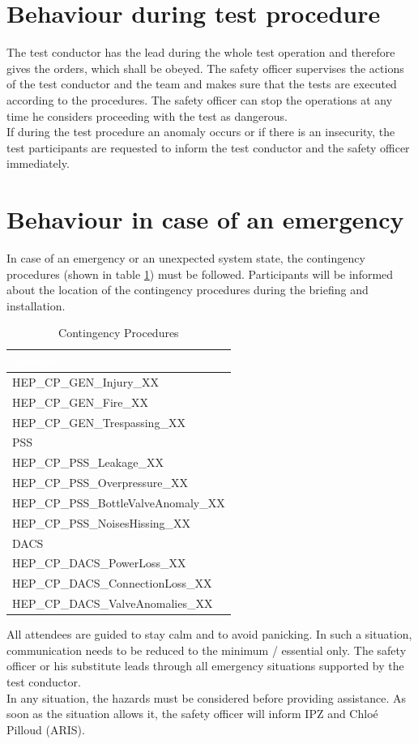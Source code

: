 \documentclass{article}
\begin{document}
\section{Behaviour during test procedure}
The test conductor has the lead during the whole test operation and therefore gives the orders, which shall be obeyed. The safety officer supervises the actions of the test conductor and the team and makes sure that the tests are executed according to the procedures. The safety officer can stop the operations at any time he considers proceeding with the test as dangerous. \\
\noindent
If during the test procedure an anomaly occurs or if there is an insecurity, the test participants are requested to inform the test conductor and the safety officer immediately.

\newpage
\section{Behaviour in case of an emergency} \label{emergency-behaviour}
In case of an emergency or an unexpected system state, the contingency procedures (shown in table \ref{tab:contingency-procedures}) must be followed. Participants will be informed about the location of the contingency procedures during the briefing and installation.
\begin{table}[h]
    \caption{Contingency Procedures}
    \label{tab:contingency-procedures}
    \begin{tabularx}{0.9\textwidth}{|X|}
        \cellcolor{blue} \textcolor{white}{General} \\ \hline
        HEP\_CP\_GEN\_Injury\_XX \\ \hline
        HEP\_CP\_GEN\_Fire\_XX \\ \hline
        HEP\_CP\_GEN\_Trespassing\_XX \\ \hline
        \cellcolor{orange} PSS \\ \hline
        HEP\_CP\_PSS\_Leakage\_XX \\ \hline
        HEP\_CP\_PSS\_Overpressure\_XX \\ \hline
        HEP\_CP\_PSS\_BottleValveAnomaly\_XX \\ \hline
        HEP\_CP\_PSS\_NoisesHissing\_XX \\ \hline
        \cellcolor{yellow} DACS \\ \hline
        HEP\_CP\_DACS\_PowerLoss\_XX \\ \hline
        HEP\_CP\_DACS\_ConnectionLoss\_XX \\ \hline
        HEP\_CP\_DACS\_ValveAnomalies\_XX \\ \hline
    \end{tabularx}
\end{table}
All attendees are guided to stay calm and to avoid panicking. In such a situation, communication needs to be reduced to the minimum / essential only. The safety officer or his substitute leads through all emergency situations supported by the test conductor. \\
\noindent
In any situation, the hazards must be considered before providing assistance.
\noindent
As soon as the situation allows it, the safety officer will inform IPZ and Chloé Pilloud (ARIS). 
\end{document}

